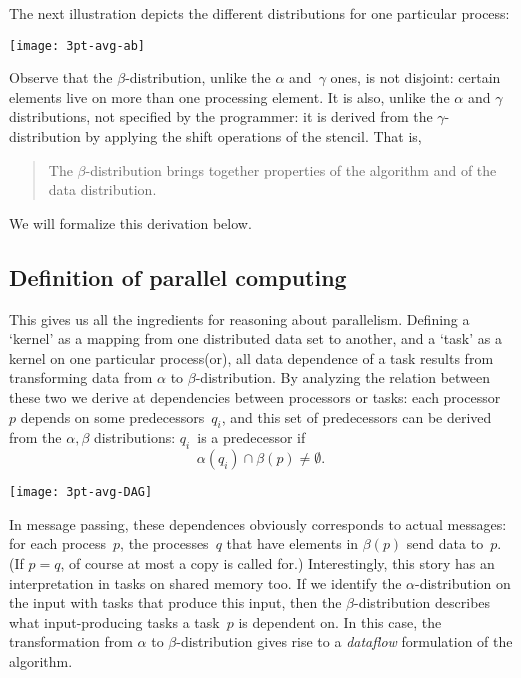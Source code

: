 The next illustration depicts the different distributions
for one particular process:

\texttt{[image: 3pt-avg-ab]}

Observe that the $\beta$-distribution, unlike the $\alpha$
and~$\gamma$ ones, is not disjoint: certain elements live on
more than one processing element. It is also, unlike
the $\alpha$ and $\gamma$ distributions, not specified by
the programmer: it is derived from the $\gamma$-distribution
by applying the shift operations of the stencil. That is,
\begin{quotation}
  \begin{mdframed}{The $\beta$-distribution brings together properties of the algorithm
    and of the data distribution.}
  \end{mdframed}
\end{quotation}
We will formalize
this derivation below.

\subsection{Definition of parallel computing}
\label{sec:3pt-dag}

This gives us all the ingredients for reasoning about parallelism.
Defining a `kernel' as a mapping from one distributed data set
to another, and a `task' as a kernel on one particular process(or),
all data dependence of a task results from transforming
data from $\alpha$ to $\beta$-distribution.
By analyzing the relation between these two we derive at dependencies
between processors or tasks: each processor~$p$ depends on
some predecessors~$q_i$, and this set of predecessors can be derived
from the $\alpha,\beta$ distributions: $q_i$~is a predecessor if
\[ \alpha(q_i)\cap\beta(p)\not=\emptyset. \]

\texttt{[image: 3pt-avg-DAG]}

In message passing, these dependences obviously corresponds
to actual messages: for each process~$p$, the processes~$q$
that have elements in $\beta(p)$
send data to~$p$. (If $p=q$, of course at most a copy is called for.)
Interestingly, this story has an interpretation in tasks on shared
memory too.  If we identify the $\alpha$-distribution on the input
with tasks that produce this input, then the $\beta$-distribution
describes what input-producing tasks a task~$p$ is dependent on. In
this case, the transformation from $\alpha$ to $\beta$-distribution
gives rise to a \emph{dataflow} formulation of the
algorithm.

